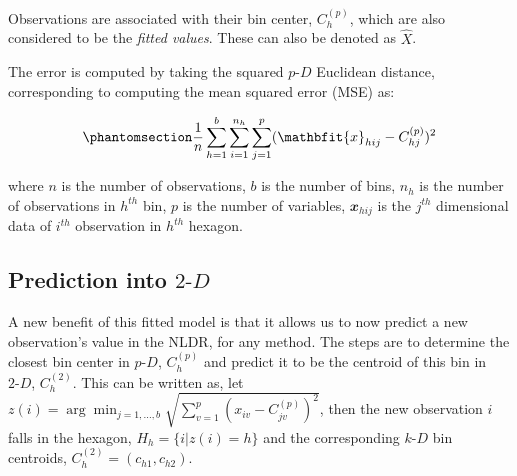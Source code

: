 \documentclass[
  12pt]{article}
\newcommand\pD{$p\text{-}D$}
\newcommand\kD{$k\text{-}D$}
\newcommand\gD{$2\text{-}D$}
\begin{document}
Observations are associated with their bin center, \(C_{h}^{(p)}\),
which are also considered to be the \emph{fitted values}. These can also
be denoted as \(\widehat{X}\).

The error is computed by taking the squared \pD{} Euclidean distance,
corresponding to computing the mean squared error (MSE) as:

\begin{equation}\phantomsection\label{eq-equation1}{\frac{1}{n}\sum_{h = 1}^{b}\sum_{i = 1}^{n_h}\sum_{j = 1}^{p} (\mathbfit{x}_{hij} - C^{(p)}_{hj})^2}\end{equation}

where \(n\) is the number of observations, \(b\) is the number of bins,
\(n_h\) is the number of observations in \(h^{th}\) bin, \(p\) is the
number of variables, \(\mathbfit{x}_{hij}\) is the \(j^{th}\)
dimensional data of \(i^{th}\) observation in \(h^{th}\) hexagon.

\subsection{\texorpdfstring{Prediction into
\gD{}}{Prediction into }}\label{prediction-into}

A new benefit of this fitted model is that it allows us to now predict a
new observation's value in the NLDR, for any method. The steps are to
determine the closest bin center in \pD{}, \(C^{(p)}_{h}\) and predict
it to be the centroid of this bin in \gD{}, \(C^{(2)}_{h}\). This can be
written as, let
\(z(i) = \arg\min_{j = 1, \dots, b} \sqrt{\sum_{v=1}^{p}(x_{iv} - C^{(p)}_{jv})^2}\),
then the new observation \(i\) falls in the hexagon,
\(H_h = \{i| z(i) = h\}\) and the corresponding \kD{} bin centroids,
\(C_{h}^{(2)} = (c_{h1}, c_{h2})\).
\end{document}
